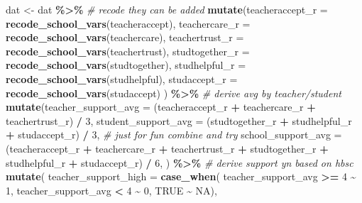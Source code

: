 \documentclass[
]{article}
\newenvironment{Shaded}{\begin{snugshade}}{\end{snugshade}}
\newcommand{\AttributeTok}[1]{\textcolor[rgb]{0.13,0.29,0.53}{#1}}
\newcommand{\CommentTok}[1]{\textcolor[rgb]{0.56,0.35,0.01}{\textit{#1}}}
\newcommand{\ConstantTok}[1]{\textcolor[rgb]{0.56,0.35,0.01}{#1}}
\newcommand{\DecValTok}[1]{\textcolor[rgb]{0.00,0.00,0.81}{#1}}
\newcommand{\FunctionTok}[1]{\textcolor[rgb]{0.13,0.29,0.53}{\textbf{#1}}}
\newcommand{\NormalTok}[1]{#1}
\newcommand{\OtherTok}[1]{\textcolor[rgb]{0.56,0.35,0.01}{#1}}
\newcommand{\SpecialCharTok}[1]{\textcolor[rgb]{0.81,0.36,0.00}{\textbf{#1}}}
\begin{document}
\begin{Shaded}
\begin{Highlighting}[]
\NormalTok{dat }\OtherTok{\textless{}{-}}\NormalTok{ dat }\SpecialCharTok{\%\textgreater{}\%}
  \CommentTok{\# recode they can be added}
  \FunctionTok{mutate}\NormalTok{(}\AttributeTok{teacheraccept\_r =} \FunctionTok{recode\_school\_vars}\NormalTok{(teacheraccept),}
         \AttributeTok{teachercare\_r =} \FunctionTok{recode\_school\_vars}\NormalTok{(teachercare),}
         \AttributeTok{teachertrust\_r =} \FunctionTok{recode\_school\_vars}\NormalTok{(teachertrust),}
         \AttributeTok{studtogether\_r =} \FunctionTok{recode\_school\_vars}\NormalTok{(studtogether),}
         \AttributeTok{studhelpful\_r =} \FunctionTok{recode\_school\_vars}\NormalTok{(studhelpful),}
         \AttributeTok{studaccept\_r =} \FunctionTok{recode\_school\_vars}\NormalTok{(studaccept)}
\NormalTok{         ) }\SpecialCharTok{\%\textgreater{}\%}
  \CommentTok{\# derive avg by teacher/student}
  \FunctionTok{mutate}\NormalTok{(}\AttributeTok{teacher\_support\_avg =}\NormalTok{ (teacheraccept\_r }
                               \SpecialCharTok{+}\NormalTok{ teachercare\_r}
                               \SpecialCharTok{+}\NormalTok{ teachertrust\_r) }\SpecialCharTok{/} \DecValTok{3}\NormalTok{,}
         \AttributeTok{student\_support\_avg =}\NormalTok{ (studtogether\_r}
                                \SpecialCharTok{+}\NormalTok{ studhelpful\_r}
                                \SpecialCharTok{+}\NormalTok{ studaccept\_r) }\SpecialCharTok{/} \DecValTok{3}\NormalTok{,}
         \CommentTok{\# just for fun combine and try}
         \AttributeTok{school\_support\_avg =}\NormalTok{ (teacheraccept\_r }
                                \SpecialCharTok{+}\NormalTok{ teachercare\_r}
                                \SpecialCharTok{+}\NormalTok{ teachertrust\_r}
                                \SpecialCharTok{+}\NormalTok{ studtogether\_r}
                                \SpecialCharTok{+}\NormalTok{ studhelpful\_r}
                                \SpecialCharTok{+}\NormalTok{ studaccept\_r) }\SpecialCharTok{/} \DecValTok{6}\NormalTok{,}
\NormalTok{         ) }\SpecialCharTok{\%\textgreater{}\%}
  \CommentTok{\# derive support yn based on hbsc}
  \FunctionTok{mutate}\NormalTok{(}
    \AttributeTok{teacher\_support\_high =} \FunctionTok{case\_when}\NormalTok{(}
\NormalTok{      teacher\_support\_avg }\SpecialCharTok{\textgreater{}=} \DecValTok{4} \SpecialCharTok{\textasciitilde{}} \DecValTok{1}\NormalTok{,}
\NormalTok{      teacher\_support\_avg }\SpecialCharTok{\textless{}} \DecValTok{4} \SpecialCharTok{\textasciitilde{}} \DecValTok{0}\NormalTok{,}
      \ConstantTok{TRUE} \SpecialCharTok{\textasciitilde{}} \ConstantTok{NA}\NormalTok{),}

\end{Highlighting}
\end{Shaded}
\end{document}
